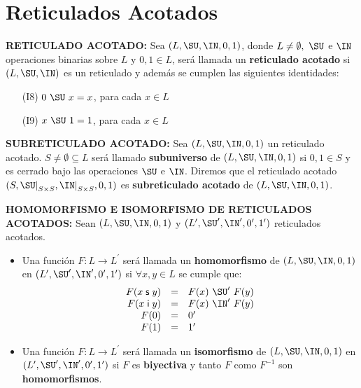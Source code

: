 \section{Reticulados Acotados}

  \PN \textbf{RETICULADO ACOTADO:} Sea $(L, \SU, \IN, 0, 1)$, donde $L \neq \emptyset, \ \SU$ e $\IN$ operaciones
  binarias sobre $L$ y $0, 1 \in L$, será llamada un \textbf{reticulado acotado} si $(L, \SU, \IN)$ es un reticulado y
  además se cumplen las siguientes identidades:
  \begin{enumerate}
    \item[(I8)] $0 \ \SU \ x = x$, para cada $x \in L$
    \item[(I9)] $x \ \SU \ 1 = 1$, para cada $x \in L$
  \end{enumerate}

  \vspace{3mm}
  \PN \textbf{SUBRETICULADO ACOTADO:} Sea $(L, \SU, \IN, 0, 1)$ un reticulado acotado. $S \neq \emptyset \subseteq L$
  será llamado \textbf{subuniverso} de $(L, \SU, \IN, 0, 1)$ si $0, 1 \in S$ y es cerrado bajo las operaciones $\SU$ e
  $\IN$. Diremos que el reticulado acotado $(S, \SU\mathrm{\mid}_{S \times S}, \IN\mathrm{\mid}_{S \times S}, 0, 1)$ es
  \textbf{subreticulado acotado} de $(L, \SU, \IN, 0, 1)$.

  \vspace{3mm}
  \PN \textbf{HOMOMORFISMO E ISOMORFISMO DE RETICULADOS ACOTADOS:} Sean $(L, \SU, \IN, 0, 1)$ y
  $(L^{\prime}, \SU^{\prime}, \IN^{\prime}, 0^{\prime}, 1^{\prime})$ reticulados acotados.
  \begin{itemize}
    \item Una función $F: L \rightarrow L^{\prime}$ será llamada un \textbf{homomorfismo} de $(L, \SU, \IN, 0, 1)$ en
      $(L^{\prime}, \SU^{\prime}, \IN^{\prime}, 0^{\prime}, 1^{\prime})$ si $\forall x, y \in L$ se cumple que:
      \[
        \begin{array}{rcl}
          F(x \mathsf{\;s\;} y) &=& F(x) \ \SU^{\prime} \ F(y) \\
          F(x \mathsf{\;i\;} y) &=& F(x) \ \IN^{\prime} \ F(y) \\
          F(0) &=& 0^{\prime} \\
          F(1) &=& 1^{\prime}
        \end{array}
      \]
    \item Una función $F: L \rightarrow L^{\prime}$ será llamada un \textbf{isomorfismo} de $(L, \SU, \IN, 0, 1)$ en
      $(L^{\prime}, \SU^{\prime}, \IN^{\prime}, 0^{\prime}, 1^{\prime})$ si $F$ es \textbf{biyectiva} y tanto $F$ como
      $F^{-1}$ son \textbf{homomorfismos}.
  \end{itemize}

